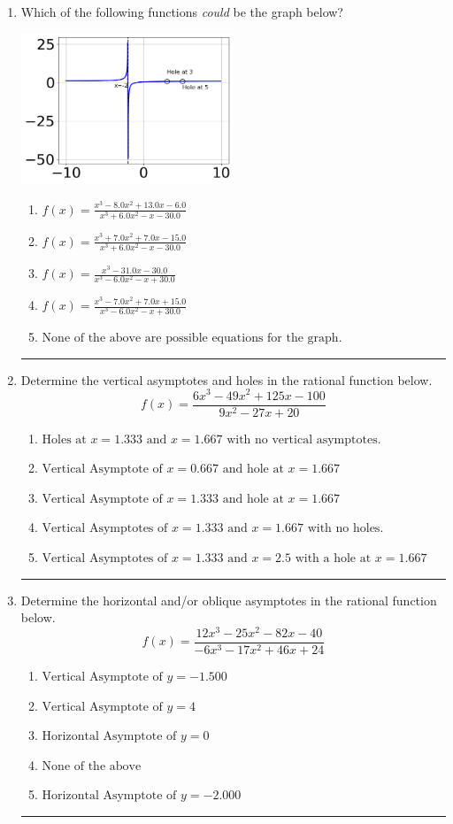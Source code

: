 \documentclass[14pt]{extbook}
\newcommand{\litem}[1]{\item#1\hspace*{-1cm}\rule{\textwidth}{0.4pt}}
\begin{document}
\begin{enumerate}
{\begin{enumerate}[label=\Alph*.]
\end{enumerate} }
\litem{
Which of the following functions \textit{could} be the graph below?
\begin{center}
    \includegraphics[width=0.5\textwidth]{../Figures/identifyGraphOfRationalFunctionA.png}
\end{center}
\begin{enumerate}[label=\Alph*.]
\item \( f(x)=\frac{x^{3} -8.0 x^{2} +13.0 x -6.0}{x^{3} +6.0 x^{2} -x -30.0} \)
\item \( f(x)=\frac{x^{3} +7.0 x^{2} +7.0 x -15.0}{x^{3} +6.0 x^{2} -x -30.0} \)
\item \( f(x)=\frac{x^{3} -31.0 x -30.0}{x^{3} -6.0 x^{2} -x + 30.0} \)
\item \( f(x)=\frac{x^{3} -7.0 x^{2} +7.0 x + 15.0}{x^{3} -6.0 x^{2} -x + 30.0} \)
\item \( \text{None of the above are possible equations for the graph.} \)

\end{enumerate} }
\litem{
Determine the vertical asymptotes and holes in the rational function below.\[ f(x) = \frac{6x^{3} -49 x^{2} +125 x -100}{9x^{2} -27 x + 20} \]\begin{enumerate}[label=\Alph*.]
\item \( \text{Holes at } x = 1.333 \text{ and } x = 1.667 \text{ with no vertical asymptotes.} \)
\item \( \text{Vertical Asymptote of } x = 0.667 \text{ and hole at } x = 1.667 \)
\item \( \text{Vertical Asymptote of } x = 1.333 \text{ and hole at } x = 1.667 \)
\item \( \text{Vertical Asymptotes of } x = 1.333 \text{ and } x = 1.667 \text{ with no holes.} \)
\item \( \text{Vertical Asymptotes of } x = 1.333 \text{ and } x = 2.5 \text{ with a hole at } x = 1.667 \)

\end{enumerate} }
\litem{
Determine the horizontal and/or oblique asymptotes in the rational function below.\[ f(x) = \frac{12x^{3} -25 x^{2} -82 x -40}{-6x^{3} -17 x^{2} +46 x + 24} \]\begin{enumerate}[label=\Alph*.]
\item \( \text{Vertical Asymptote of } y = -1.500  \)
\item \( \text{Vertical Asymptote of } y = 4  \)
\item \( \text{Horizontal Asymptote of } y = 0  \)
\item \( \text{None of the above} \)
\item \( \text{Horizontal Asymptote of } y = -2.000  \)


\end{enumerate}}
\end{enumerate}
\end{document}
